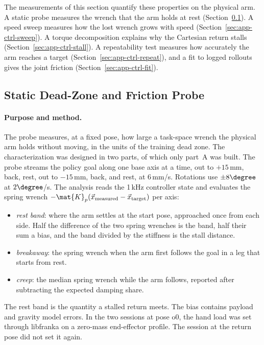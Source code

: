 The measurements of this section quantify these properties on the physical arm. A static probe measures the wrench that the arm holds at rest (Section~\ref{sec:app-ctrl-probe}). A speed sweep measures how the lost wrench grows with speed (Section~\ref{sec:app-ctrl-sweep}). A torque decomposition explains why the Cartesian return stalls (Section~\ref{sec:app-ctrl-stall}). A repeatability test measures how accurately the arm reaches a target (Section~\ref{sec:app-ctrl-repeat}), and a fit to logged rollouts gives the joint friction (Section~\ref{sec:app-ctrl-fit}).

\subsection{Static Dead-Zone and Friction Probe}\label{sec:app-ctrl-probe}

\paragraph{Purpose and method.} The probe measures, at a fixed pose, how large a task-space wrench the physical arm holds without moving, in the units of the training dead zone. The characterization was designed in two parts, of which only part~A was built. The probe streams the policy goal along one base axis at a time, out to $+15$\,mm, back, rest, out to $-15$\,mm, back, and rest, at 6\,mm/s. Rotations use $\pm8\degree$ at $2\degree$/s. The analysis reads the 1\,kHz controller state and evaluates the spring wrench $-\mat{K}_p(\vec{x}_{\mathrm{measured}}-\vec{x}_{\mathrm{target}})$ per axis:
\begin{itemize}
  \item \emph{rest band}: where the arm settles at the start pose, approached once from each side. Half the difference of the two spring wrenches is the band, half their sum a bias, and the band divided by the stiffness is the stall distance.
  \item \emph{breakaway}: the spring wrench when the arm first follows the goal in a leg that starts from rest.
  \item \emph{creep}: the median spring wrench while the arm follows, reported after subtracting the expected damping share.
\end{itemize}
The rest band is the quantity a stalled return meets. The bias contains payload and gravity model errors. In the two sessions at pose o0, the hand load was set through libfranka on a zero-mass end-effector profile. The session at the return pose did not set it again.

